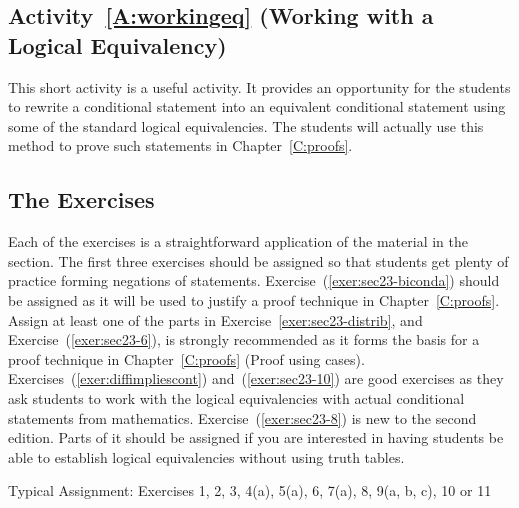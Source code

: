 \subsection*{Activity~\ref{A:workingeq} (Working with a Logical Equivalency)}
This short activity is a useful activity.  It provides an opportunity for the students to rewrite a conditional statement into an equivalent conditional statement using some of the standard logical equivalencies.  The students will actually use this method to prove such statements in Chapter~\ref{C:proofs}.

\hbreak


\subsection*{The Exercises}

Each of the exercises is a straightforward application of the material in the section.  The first three exercises should be assigned so that students get plenty of practice forming negations of statements.  Exercise~(\ref{exer:sec23-biconda}) should be assigned as it will be used to justify a proof technique in Chapter~\ref{C:proofs}.  Assign at least one of the parts in 
Exercise~\ref{exer:sec23-distrib}, and Exercise~(\ref{exer:sec23-6}), 
is strongly recommended as it forms the basis for a proof technique in Chapter~\ref{C:proofs} (Proof using cases).  Exercises~(\ref{exer:diffimpliescont}) and~(\ref{exer:sec23-10}) are good exercises as they ask students to work with the logical equivalencies with actual conditional statements from mathematics.  
Exercise~(\ref{exer:sec23-8}) is new to the second edition.  Parts of it should be assigned if you are interested in having students be able to establish logical equivalencies without using truth tables.

\vskip6pt
\noindent
Typical Assignment:  Exercises 1, 2, 3, 4(a), 5(a), 6, 7(a), 8, 9(a, b, c), 10 or 11
\hbreak
\endinput
